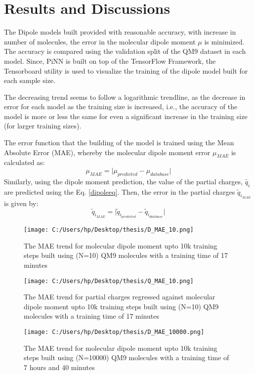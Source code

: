 \documentclass[11pt,a4paper]{report}
\begin{document}
{\section{Results and Discussions}
The Dipole models built provided with reasonable accuracy, with increase in number of molecules, the error in the molecular dipole moment $\mu$ is minimized. The accuracy is compared using the validation split of the QM9 dataset in each model. Since, PiNN is built on top of the TensorFlow\cite{tf} Framework, the Tensorboard utility is used to visualize the training of the dipole model built for each sample size.

The decreasing trend seems to follow a logarithmic trendline, as the decrease in error for each model as the training size is increased, i.e., the accuracy of the model is more or less the same for even a significant increase in the training size (for larger training sizes). 

The error function that the building of the model is trained using the Mean Absolute Error (MAE), whereby the molecular dipole moment error $\mu_{MAE}$ is calculated as:
\begin{equation}
\mu_{MAE}=\big|\mu_{predicted} - \mu_{database}\big|
\end{equation}
Similarly, using the dipole moment prediction, the value of the partial charges, $\tilde{q_i}$ are predicted using the Eq. \ref{dipoleeq}. Then, the error in the partial charges $\tilde{q}_{i_{MAE}}$ is given by:
\begin{equation}
\tilde{q}_{i_{MAE}}=\big|\tilde{q}_{i_{predicted}} - \tilde{q}_{i_{database}}\big|
\end{equation}

\pagebreak
\begin{figure} 
\centering
\texttt{[image: C:/Users/hp/Desktop/thesis/D\_MAE\_10.png]}
\caption{The MAE trend for molecular dipole moment upto 10k training steps built using (N=10) QM9 molecules with a training time of 17 minutes}
\end{figure}

\begin{figure} [H]
\centering
\texttt{[image: C:/Users/hp/Desktop/thesis/Q\_MAE\_10.png]}
\caption{The MAE trend for partial charges regressed against molecular dipole moment upto 10k training steps built using (N=10) QM9 molecules with a training time of 17 minutes}
\end{figure}

\begin{figure} 
\centering
\texttt{[image: C:/Users/hp/Desktop/thesis/D\_MAE\_10000.png]}
\caption{The MAE trend for molecular dipole moment upto 10k training steps built using (N=10000) QM9 molecules with a training time of 7 hours and 40 minutes}
\end{figure}

}
\end{document}
